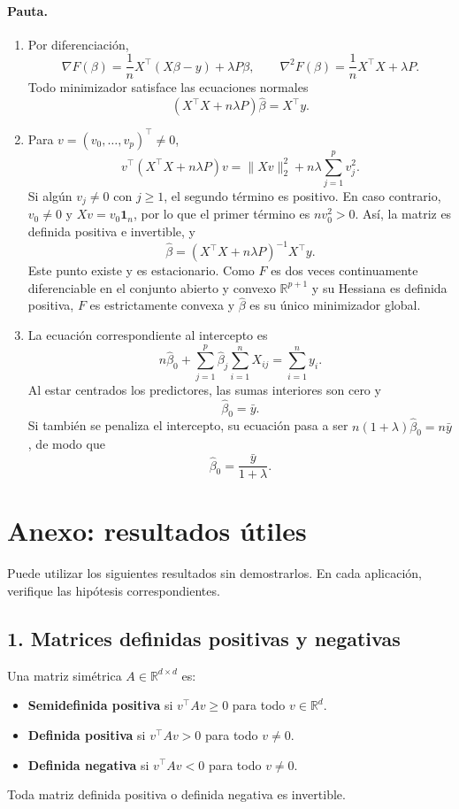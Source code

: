 \documentclass[a4paper,12 pt]{article}
\theoremstyle{definition}
\newcommand{\R}{\mathbb{R}}
\begin{document}
\paragraph{Pauta.}
\begin{enumerate}
    \item Por diferenciación,
    \[
    \boxed{\nabla F(\beta)=\frac1nX^\top(X\beta-y)+\lambda P\beta,
    \qquad \nabla^2 F(\beta)=\frac1nX^\top X+\lambda P.}
    \]
    Todo minimizador satisface las ecuaciones normales
    \[
    (X^\top X+n\lambda P)\widehat\beta=X^\top y.
    \]
    \item Para $v=(v_0,\ldots,v_p)^\top\neq0$,
    \[
    v^\top(X^\top X+n\lambda P)v
    =\|Xv\|_2^2+n\lambda\sum_{j=1}^p v_j^2.
    \]
    Si algún $v_j\neq0$ con $j\geq1$, el segundo término es positivo.
    En caso contrario, $v_0\neq0$ y $Xv=v_0\mathbf{1}_n$, por lo que
    el primer término es $nv_0^2>0$. Así, la matriz es definida positiva
    e invertible, y
    \[
    \boxed{\widehat\beta=(X^\top X+n\lambda P)^{-1}X^\top y.}
    \]
    Este punto existe y es estacionario. Como $F$ es dos veces
    continuamente diferenciable en el conjunto abierto y convexo
    $\R^{p+1}$ y su Hessiana es definida positiva, $F$ es estrictamente
    convexa y $\widehat\beta$ es su único minimizador global.
    \item La ecuación correspondiente al intercepto es
    \[
    n\widehat\beta_0+
    \sum_{j=1}^p\widehat\beta_j\sum_{i=1}^n X_{ij}
    =\sum_{i=1}^n y_i.
    \]
    Al estar centrados los predictores, las sumas interiores son cero y
    \[
    \boxed{\widehat\beta_0=\bar y.}
    \]
    Si también se penaliza el intercepto, su ecuación pasa a ser
    $n(1+\lambda)\widehat\beta_0=n\bar y$, de modo que
    \[
    \boxed{\widehat\beta_0=\frac{\bar y}{1+\lambda}.}
    \]
\end{enumerate}


	
\section*{Anexo: resultados útiles}
Puede utilizar los siguientes resultados sin demostrarlos. En cada aplicación, verifique las hipótesis correspondientes.

\subsection*{1. Matrices definidas positivas y negativas}
Una matriz simétrica $A\in\R^{d\times d}$ es:
\begin{itemize}
    \item \textbf{Semidefinida positiva} si $v^\top Av\geq0$ para todo $v\in\R^d$.
    \item \textbf{Definida positiva} si $v^\top Av>0$ para todo $v\neq0$.
    \item \textbf{Definida negativa} si $v^\top Av<0$ para todo $v\neq0$.
\end{itemize}
Toda matriz definida positiva o definida negativa es invertible.
\end{document}
